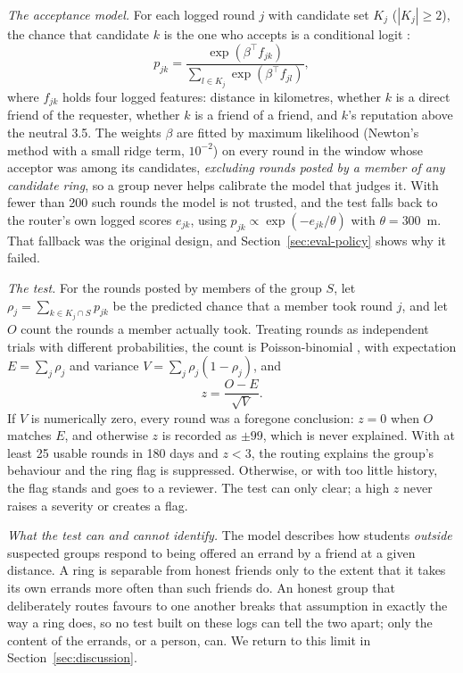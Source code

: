 \documentclass[journal]{IEEEtran}
\begin{document}
\emph{The acceptance model.} For each logged round $j$ with candidate set $K_j$
($|K_j|\ge2$), the chance that candidate $k$ is the one who accepts is a conditional
logit \cite{mcfadden1974conditional}:
\begin{equation}
p_{jk} = \frac{\exp(\beta^{\top}f_{jk})}{\sum_{l\in K_j}\exp(\beta^{\top}f_{jl})},
\label{eq:logit}
\end{equation}
where $f_{jk}$ holds four logged features: distance in kilometres, whether $k$ is a
direct friend of the requester, whether $k$ is a friend of a friend, and $k$'s
reputation above the neutral 3.5. The weights $\beta$ are fitted by maximum
likelihood (Newton's method with a small ridge term, $10^{-2}$) on every round in
the window whose acceptor was among its candidates, \emph{excluding rounds posted by
a member of any candidate ring}, so a group never helps calibrate the model that
judges it. With fewer than 200 such rounds the model is not trusted, and the test
falls back to the router's own logged scores $e_{jk}$, using
$p_{jk}\propto\exp(-e_{jk}/\theta)$ with $\theta=300$~m. That fallback was the
original design, and Section~\ref{sec:eval-policy} shows why it failed.

\emph{The test.} For the rounds posted by members of the group $S$, let
$\rho_j=\sum_{k\in K_j\cap S}p_{jk}$ be the predicted chance that a member took round
$j$, and let $O$ count the rounds a member actually took. Treating rounds as
independent trials with different probabilities, the count is Poisson-binomial
\cite{wang1993number}, with expectation $E=\sum_j\rho_j$ and variance
$V=\sum_j\rho_j(1-\rho_j)$, and
\begin{equation}
z = \frac{O-E}{\sqrt{V}}. \label{eq:z}
\end{equation}
If $V$ is numerically zero, every round was a foregone conclusion: $z=0$ when $O$
matches $E$, and otherwise $z$ is recorded as $\pm99$, which is never explained. With
at least 25 usable rounds in 180 days and $z<3$, the routing explains the group's
behaviour and the ring flag is suppressed. Otherwise, or with too little history,
the flag stands and goes to a reviewer. The test can only clear; a high $z$ never
raises a severity or creates a flag.

\emph{What the test can and cannot identify.} The model describes how students
\emph{outside} suspected groups respond to being offered an errand by a friend at a
given distance. A ring is separable from honest friends only to the extent that it
takes its own errands more often than such friends do. An honest group that
deliberately routes favours to one another breaks that assumption in exactly the way
a ring does, so no test built on these logs can tell the two apart; only the content
of the errands, or a person, can. We return to this limit in
Section~\ref{sec:discussion}.
\end{document}
